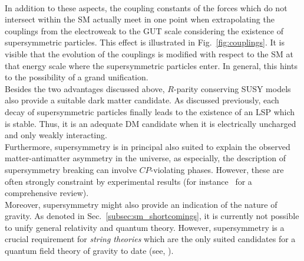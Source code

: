 \\
In addition to these aspects, the coupling constants of the forces which do not intersect within the SM actually meet in one point when extrapolating the couplings from the electroweak to the GUT scale considering the existence of supersymmetric particles. This effect is illustrated in Fig.~\ref{fig:couplings}. It is visible that the evolution of the couplings is modified with respect to the SM at that energy scale where the supersymmetric particles enter. In general, this hints to the possibility of a grand unification.\\
Besides the two advantages discussed above, $R$-parity conserving SUSY models also provide a suitable dark matter candidate. As discussed previously, each decay of supersymmetric particles finally leads to the existence of an LSP which is stable. Thus, it is an adequate DM candidate when it is electrically uncharged and only weakly interacting. \\
Furthermore, supersymmetry is in principal also suited to explain the observed matter-antimatter asymmetry in the universe, as especially, the description of supersymmetry breaking can involve $CP$-violating phases. However, these are often strongly constraint by experimental results (\cf for instance~\cite{Ibrahim:2007fb} for a comprehensive review). \\
Moreover, supersymmetry might also provide an indication of the nature of gravity. As denoted in Sec.~\ref{subsec:sm_shortcomings}, it is currently not possible to unify general relativity and quantum theory. However, supersymmetry is a crucial requirement for \textit{string theories} which are the only suited candidates for a quantum field theory of gravity to date (see, \eg\cite{RevModPhys.47.123}).


